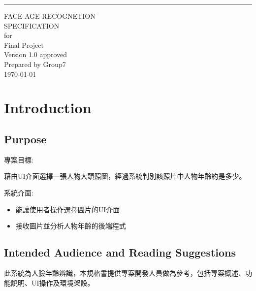 \documentclass{scrreprt}
\date{}
\def\myversion{1.0 }
\begin{document}
\begin{CJK}{UTF8}{bkai}

\begin{flushright}
    \rule{16cm}{5pt}\vskip1cm
    \begin{bfseries}
        \Huge{FACE AGE RECOGNETION\\ SPECIFICATION}\\
        \vspace{1.9cm}
        for\\
        \vspace{1.9cm}
        Final Project\\
        \vspace{1.9cm}
        \LARGE{Version \myversion approved}\\
        \vspace{1.9cm}
        Prepared by Group7\\
        \vspace{1.9cm}
        \today\\
    \end{bfseries}
\end{flushright}

\tableofcontents

\chapter{Introduction}

\section{Purpose}
    \begin{description}
        \item 專案目標:
        \begin{description}
            \item 藉由UI介面選擇一張人物大頭照圖，經過系統判別該照片中人物年齡約是多少。
        \end{description}
        \item 系統介面:
        \begin{itemize}
            \item 能讓使用者操作選擇圖片的UI介面
            \item 接收圖片並分析人物年齡的後端程式
        \end{itemize}
    \end{description}

\section{Intended Audience and Reading Suggestions}
此系統為人臉年齡辨識，本規格書提供專案開發人員做為參考，包括專案概述、功能說明、UI操作及環境架設。


\end{CJK}
\end{document}
